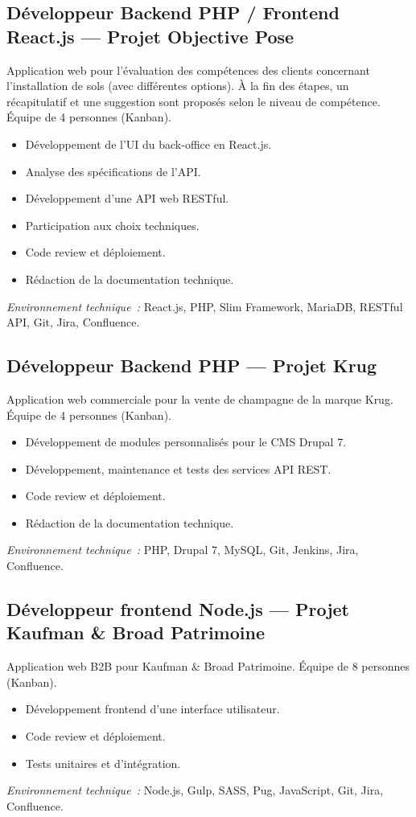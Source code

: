 \documentclass[10pt,a4paper]{article}
\begin{document}
\subsection*{Développeur Backend PHP / Frontend React.js --- Projet Objective Pose}
\color{darkgray}
Application web pour l'évaluation des compétences des clients concernant l'installation de sols (avec différentes options). À la fin des étapes, un récapitulatif et une suggestion sont proposés selon le niveau de compétence. Équipe de 4 personnes (Kanban).
\begin{itemize}
  \item Développement de l'UI du back-office en React.js.
  \item Analyse des spécifications de l'API.
  \item Développement d'une API web RESTful.
  \item Participation aux choix techniques.
  \item Code review et déploiement.
  \item Rédaction de la documentation technique.
\end{itemize}
\textit{Environnement technique~:} React.js, PHP, Slim Framework, MariaDB, RESTful API, Git, Jira, Confluence.

\vspace{6pt}

\subsection*{Développeur Backend PHP --- Projet Krug}
\color{darkgray}
Application web commerciale pour la vente de champagne de la marque Krug. Équipe de 4 personnes (Kanban).
\begin{itemize}
  \item Développement de modules personnalisés pour le CMS Drupal 7.
  \item Développement, maintenance et tests des services API REST.
  \item Code review et déploiement.
  \item Rédaction de la documentation technique.
\end{itemize}
\textit{Environnement technique~:} PHP, Drupal 7, MySQL, Git, Jenkins, Jira, Confluence.

\vspace{6pt}

\subsection*{Développeur frontend Node.js --- Projet Kaufman \& Broad Patrimoine}
\color{darkgray}
Application web B2B pour Kaufman \& Broad Patrimoine. Équipe de 8 personnes (Kanban).
\begin{itemize}
  \item Développement frontend d'une interface utilisateur.
  \item Code review et déploiement.
  \item Tests unitaires et d'intégration.
\end{itemize}
\textit{Environnement technique~:} Node.js, Gulp, SASS, Pug, JavaScript, Git, Jira, Confluence.
\end{document}
